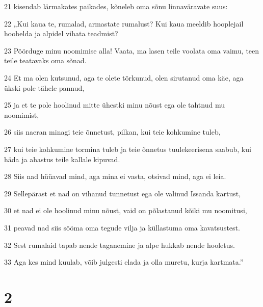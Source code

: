 \par 21 kisendab lärmakates paikades, kõneleb oma sõnu linnaväravate suus:
\par 22 „Kui kaua te, rumalad, armastate rumalust? Kui kaua meeldib hooplejail hoobelda ja alpidel vihata teadmist?
\par 23 Pöörduge minu noomimise alla! Vaata, ma lasen teile voolata oma vaimu, teen teile teatavaks oma sõnad.
\par 24 Et ma olen kutsunud, aga te olete tõrkunud, olen sirutanud oma käe, aga ükski pole tähele pannud,
\par 25 ja et te pole hoolinud mitte ühestki minu nõust ega ole tahtnud mu noomimist,
\par 26 siis naeran minagi teie õnnetust, pilkan, kui teie kohkumine tuleb,
\par 27 kui teie kohkumine tormina tuleb ja teie õnnetus tuulekeerisena saabub, kui häda ja ahastus teile kallale kipuvad.
\par 28 Siis nad hüüavad mind, aga mina ei vasta, otsivad mind, aga ei leia.
\par 29 Sellepärast et nad on vihanud tunnetust ega ole valinud Issanda kartust,
\par 30 et nad ei ole hoolinud minu nõust, vaid on põlastanud kõiki mu noomitusi,
\par 31 peavad nad siis sööma oma tegude vilja ja küllastuma oma kavatsustest.
\par 32 Sest rumalaid tapab nende taganemine ja alpe hukkab nende hooletus.
\par 33 Aga kes mind kuulab, võib julgesti elada ja olla muretu, kurja kartmata.”

\chapter{2}

